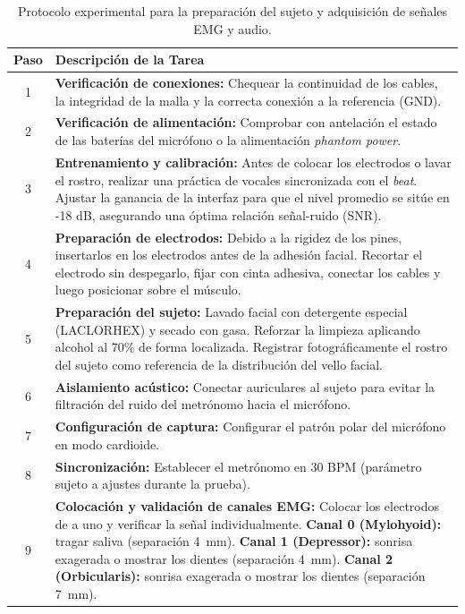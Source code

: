 \begin{table}[H]
    \centering
    \footnotesize
    \caption{Protocolo experimental para la preparación del sujeto y adquisición de señales EMG y audio.}
    \label{tab:protocolo_emg_labo7}
    \renewcommand{\arraystretch}{1.5}
    \begin{tabularx}{\linewidth}{c X}
        \toprule
        \textbf{Paso} & \textbf{Descripción de la Tarea} \\
        \midrule
        1 & \textbf{Verificación de conexiones:} Chequear la continuidad de los cables, la integridad de la malla y la correcta conexión a la referencia (GND). \\
        2 & \textbf{Verificación de alimentación:} Comprobar con antelación el estado de las baterías del micrófono o la alimentación \textit{phantom power}. \\
        3 & \textbf{Entrenamiento y calibración:} Antes de colocar los electrodos o lavar el rostro, realizar una práctica de vocales sincronizada con el \textit{beat}. Ajustar la ganancia de la interfaz para que el nivel promedio se sitúe en -18 dB, asegurando una óptima relación señal-ruido (SNR). \\
        4 & \textbf{Preparación de electrodos:} Debido a la rigidez de los pines, insertarlos en los electrodos antes de la adhesión facial. Recortar el electrodo sin despegarlo, fijar con cinta adhesiva, conectar los cables y luego posicionar sobre el músculo. \\
        5 & \textbf{Preparación del sujeto:} Lavado facial con detergente especial (LACLORHEX) y secado con gasa. Reforzar la limpieza aplicando alcohol al 70\% de forma localizada. Registrar fotográficamente el rostro del sujeto como referencia de la distribución del vello facial. \\
        6 & \textbf{Aislamiento acústico:} Conectar auriculares al sujeto para evitar la filtración del ruido del metrónomo hacia el micrófono. \\
        7 & \textbf{Configuración de captura:} Configurar el patrón polar del micrófono en modo cardioide. \\
        8 & \textbf{Sincronización:} Establecer el metrónomo en 30 BPM (parámetro sujeto a ajustes durante la prueba). \\
        9 & \textbf{Colocación y validación de canales EMG:} Colocar los electrodos de a uno y verificar la señal individualmente. \textbf{Canal 0 (Mylohyoid):} tragar saliva (separación \SI{4}{\milli\meter}). \textbf{Canal 1 (Depressor):} sonrisa exagerada o mostrar los dientes (separación \SI{4}{\milli\meter}). \textbf{Canal 2 (Orbicularis):} sonrisa exagerada o mostrar los dientes (separación \SI{7}{\milli\meter}). \\
        \bottomrule
    \end{tabularx}
\end{table}

